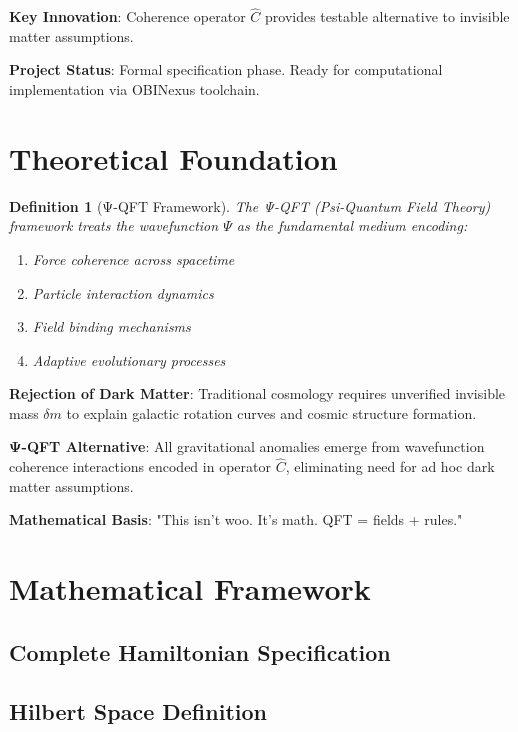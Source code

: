 \documentclass{article}
\newtheorem{definition}{Definition}[section]
\begin{document}
\begin{tcolorbox}[colback=blue!5!white,colframe=blue!75!black,title=Coherence Operator]
\begin{tcolorbox}[title={Executive Summary - OBINexus Framework},obinexus]
\textbf{Key Innovation}: Coherence operator $\hat{C}$ provides testable alternative to invisible matter assumptions.

\textbf{Project Status}: Formal specification phase. Ready for computational implementation via OBINexus toolchain.


\section{Theoretical Foundation}

\begin{definition}[Ψ-QFT Framework]
The Ψ-QFT (Psi-Quantum Field Theory) framework treats the wavefunction $\Psi$ as the fundamental medium encoding:
\begin{enumerate}
\item Force coherence across spacetime
\item Particle interaction dynamics  
\item Field binding mechanisms
\item Adaptive evolutionary processes
\end{enumerate}
\end{definition}

\begin{tcolorbox}[title={Core Premise (Technical)},theory]
\textbf{Rejection of Dark Matter}: Traditional cosmology requires unverified invisible mass $\delta m$ to explain galactic rotation curves and cosmic structure formation.

\textbf{Ψ-QFT Alternative}: All gravitational anomalies emerge from wavefunction coherence interactions encoded in operator $\hat{C}$, eliminating need for ad hoc dark matter assumptions.

\textbf{Mathematical Basis}: "This isn't woo. It's math. QFT = fields + rules."


\section{Mathematical Framework}

\subsection{Complete Hamiltonian Specification}

\subsection{Hilbert Space Definition}


\end{tcolorbox}
\end{tcolorbox}
\end{tcolorbox}
\end{document}
